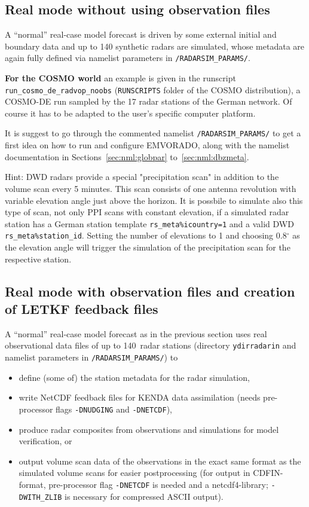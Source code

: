 \documentclass[10pt,a4paper,twoside,headinclude,footinclude,parskip=half]{scrartcl}
\newcommand{\myaktuellesection}{sec:intro}%
\newcommand{\labelsec}[1]{\label{#1}\renewcommand{\myaktuellesection}{#1}}%
\newcommand{\labelsec}[1]{\label{#1}}%
\newcommand{\grad}{\ensuremath{^{\circ}}\xspace}
\newcommand{\srcform}[1]{\mbox{\texttt{#1}}\xspace}%
\newcommand{\paramform}[1]{\mbox{\texttt{#1}}\xspace}%
\begin{document}
\subsection{Real mode without using observation files}

\labelsec{sec:modern}

A ``normal'' real-case model forecast is driven by some external
initial and boundary data and up to 140 synthetic radars are simulated,
whose metadata are again fully defined via namelist parameters in \srcform{/RADARSIM_PARAMS/}.

\textbf{For the COSMO world} an example is given in the runscript \srcform{run_cosmo_de_radvop_noobs} (\srcform{RUNSCRIPTS} folder of the COSMO distribution), a COSMO-DE run sampled
by the 17 radar stations of the German network.
Of course it has to be adapted to the user's specific computer platform.

It is suggest to go through the commented namelist \srcform{/RADARSIM_PARAMS/}
to get a first idea on how to run and configure EMVORADO, along with the namelist documentation
in Sections~\ref{sec:nml:globpar} to~\ref{sec:nml:dbzmeta}.

Hint: DWD radars provide a special "precipitation scan" in addition to the volume scan every 5 minutes. This scan consists of one antenna revolution with variable elevation angle just above the horizon. It is possbile to simulate also this type of scan, not only PPI scans with constant elevation, if a simulated radar station has a German station template \paramform{rs_meta\%icountry=1} and a valid DWD \paramform{rs_meta\%station_id}. Setting the number of elevations to 1 and choosing 0.8\grad as the elevation angle will trigger the simulation of the precipitation scan for the respective station.  

\subsection{Real mode with observation files and creation of LETKF feedback files}

\labelsec{sec:modero}


A ``normal'' real-case model forecast as in the previous section
uses real observational data files of up to 140~radar stations (directory \srcform{ydirradarin} and namelist parameters in \srcform{/RADARSIM_PARAMS/}) to
\begin{itemize}
\item define (some of) the station metadata for the radar simulation,
\item write NetCDF feedback files for KENDA data assimilation (needs pre-processor flags
  \srcform{-DNUDGING} and \srcform{-DNETCDF}),
\item produce radar composites from observations and simulations for model verification, or
\item output volume scan data of the observations in the exact same format as the simulated volume scans for easier postprocessing
  (for output in CDFIN-format, pre-processor flag \srcform{-DNETCDF} is needed and a netcdf4-library;
  \srcform{-DWITH_ZLIB} is necessary for compressed ASCII output).
\end{itemize}
\end{document}
